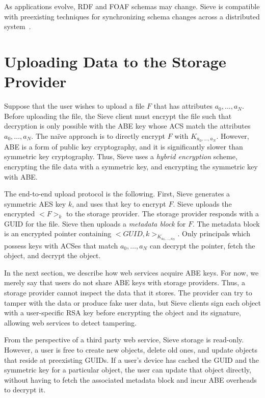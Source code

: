 As applications evolve, RDF and FOAF schemas
may change. Sieve is compatible with
preexisting techniques for synchronizing
schema changes across a distributed system~\cite{f1,maintaindataware, onthefly}.

\section{Uploading Data to the Storage Provider}
\label{sec:dataPush}

Suppose that the user wishes to upload a file
$F$ that has attributes $a_0,\ldots,a_N$.
Before uploading the file, the Sieve client
must encrypt the file such that decryption
is only possible with the ABE key whose ACS
match the attributes $a_0,\ldots,a_N$. The na{\"i}ve
approach is to directly encrypt $F$ with
$K_{a_0,\ldots,a_N}$. However, ABE is a form of
public key cryptography, and it is significantly
slower than symmetric key cryptography. Thus,
Sieve uses a \textit{hybrid encryption} scheme,
encrypting the file data with a symmetric key,
and encrypting the symmetric key with ABE.

The end-to-end upload protocol is the following.
First, Sieve generates a symmetric AES key $k$,
and uses that key to encrypt $F$. Sieve uploads
the encrypted $<F>_k$ to the storage provider.
The storage provider responds with a GUID for
the file. Sieve then uploads a \emph{metadata
block} for $F$. The metadata block is an encrypted
pointer containing $<GUID, k>_{K_{a_0,\ldots,a_N}}$.
Only principals which possess keys with ACSes that
match $a_0,\ldots,a_N$ can
decrypt the pointer, fetch the object, and
decrypt the object.

In the next section, we describe how web services
acquire ABE keys. For now, we merely say that
users do not share ABE keys with storage providers.
Thus, a storage provider cannot inspect the data
that it stores. The provider can try to tamper
with the data or produce fake user data, but
Sieve clients sign each object with a user-specific
RSA key before encrypting the object and its signature, 
allowing web services to detect tampering.

From the perspective of a third party
web service, Sieve storage is read-only.
However, a user is free to create new
objects, delete old ones, and update
objects that reside at preexisting
GUIDs. If a user's device has cached
the GUID and the symmetric key for a
particular object, the user can update
that object directly, without having
to fetch the associated metadata block
and incur ABE overheads to decrypt it.

